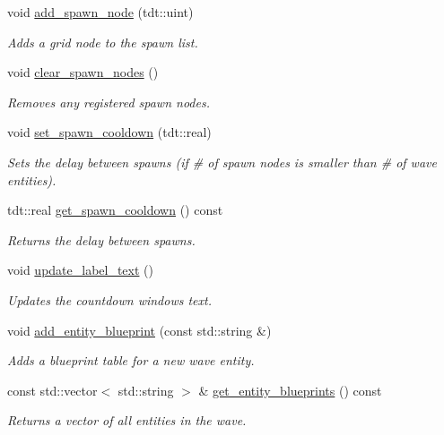 \begin{DoxyCompactItemize}
void \hyperlink{class_wave_system_a50b83a5cd977a4f834044b7613bfc3d2}{add\+\_\+spawn\+\_\+node} (tdt\+::uint)
\begin{DoxyCompactList}\small\item\em Adds a grid node to the spawn list. \end{DoxyCompactList}\item 
void \hyperlink{class_wave_system_ab818eaa3d2058bb1f6c1cf917ffb6dec}{clear\+\_\+spawn\+\_\+nodes} ()
\begin{DoxyCompactList}\small\item\em Removes any registered spawn nodes. \end{DoxyCompactList}\item 
void \hyperlink{class_wave_system_acd6966753dd5d2e99d7c29069308c38b}{set\+\_\+spawn\+\_\+cooldown} (tdt\+::real)
\begin{DoxyCompactList}\small\item\em Sets the delay between spawns (if \# of spawn nodes is smaller than \# of wave entities). \end{DoxyCompactList}\item 
tdt\+::real \hyperlink{class_wave_system_a9496f6b821617e2554634c5866ea0be6}{get\+\_\+spawn\+\_\+cooldown} () const 
\begin{DoxyCompactList}\small\item\em Returns the delay between spawns. \end{DoxyCompactList}\item 
void \hyperlink{class_wave_system_a619c6572a4926d37af744d382be38bef}{update\+\_\+label\+\_\+text} ()
\begin{DoxyCompactList}\small\item\em Updates the countdown window\textquotesingle{}s text. \end{DoxyCompactList}\item 
void \hyperlink{class_wave_system_af231cca40f1e32e3fa4f9f38b92a760d}{add\+\_\+entity\+\_\+blueprint} (const std\+::string \&)
\begin{DoxyCompactList}\small\item\em Adds a blueprint table for a new wave entity. \end{DoxyCompactList}\item 
const std\+::vector$<$ std\+::string $>$ \& \hyperlink{class_wave_system_a9f7d4f3574df6e75384d0eef48d8a011}{get\+\_\+entity\+\_\+blueprints} () const 
\begin{DoxyCompactList}\small\item\em Returns a vector of all entities in the wave. \end{DoxyCompactList}\item 

\end{DoxyCompactItemize}
